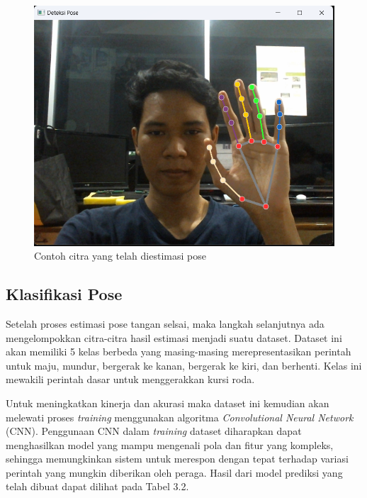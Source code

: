 \begin{figure} [ht] \centering
    \includegraphics[scale=0.9]{gambar/bab3/EstimasiPose.png}
    \caption{Contoh citra yang telah diestimasi pose}
    \label{fig:contoh citra yang telah diestimasi pose}
\end{figure}

\subsection{Klasifikasi Pose}
Setelah proses estimasi pose tangan selsai, maka langkah selanjutnya ada mengelompokkan citra-citra hasil estimasi menjadi suatu dataset. Dataset ini akan memiliki 5 kelas berbeda yang masing-masing merepresentasikan perintah untuk maju, mundur, bergerak ke kanan, bergerak ke kiri, dan berhenti. Kelas ini mewakili perintah dasar untuk menggerakkan kursi roda. 

Untuk meningkatkan kinerja dan akurasi maka dataset ini kemudian akan melewati proses \emph{training} menggunakan algoritma \emph{Convolutional Neural Network} (CNN). Penggunaan CNN dalam \emph{training} dataset diharapkan dapat menghasilkan model yang mampu mengenali pola dan fitur yang kompleks, sehingga memungkinkan sistem untuk merespon dengan tepat terhadap variasi perintah yang mungkin diberikan oleh peraga. Hasil dari model prediksi yang telah dibuat dapat dilihat pada Tabel 3.2.

\newpage

